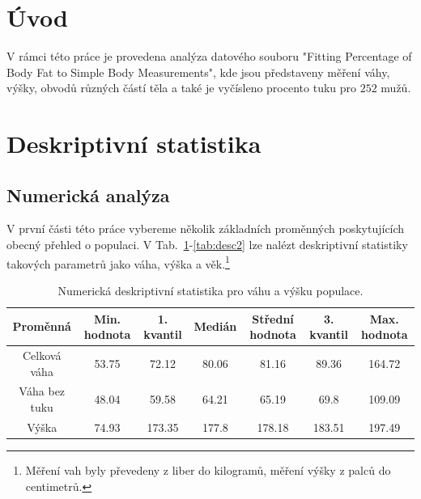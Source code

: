 \documentclass[11pt,american,czech]{article}
\begin{document}
\begin{titlepage}
	
%	
	
	\vfill %
	
\end{titlepage}


\section{Úvod}\label{sec:1}

V rámci této práce je provedena analýza datového souboru "Fitting Percentage of Body Fat to Simple Body Measurements", kde jsou představeny měření váhy, výšky, obvodů různých částí těla a také je vyčísleno procento tuku pro $252$ mužů.

\section{Deskriptivní statistika}

\subsection{Numerická analýza}

V první části této práce vybereme několik základních proměnných poskytujících obecný přehled o populaci. V Tab.~\ref{tab:desc1}-\ref{tab:desc2} lze nalézt deskriptivní statistiky takových parametrů jako váha, výška a věk.\footnote{Měření vah byly převedeny z liber do kilogramů, měření výšky z palců do centimetrů.} 

\medskip

\begin{table}[ht!]
	\centering
	\begin{tabular}{|c||c|c|c|c|c|c|}
		\hline 
		Proměnná &  Min. hodnota &  1. kvantil &  Medián &  Střední hodnota &  3. kvantil & Max. hodnota   \\ 
		\hline \hline 
		Celková váha & 53.75 & 72.12 & 80.06 & 81.16 & 89.36 & 164.72   \\ 
		\hline 
		Váha bez tuku & 48.04 & 59.58 & 64.21 & 65.19 & 69.8 & 109.09   \\ 
		\hline 
		Výška & 74.93 & 173.35 & 177.8 & 178.18 & 183.51 & 197.49   \\ 
		\hline 
	\end{tabular} 
	\caption{Numerická deskriptivní statistika pro váhu a výšku populace.}	
	\label{tab:desc1}
\end{table}
\end{document}
